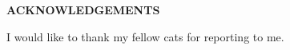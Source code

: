 \begin{center}
    \large{\bf ACKNOWLEDGEMENTS}
\end{center}

I would like to thank my fellow cats for reporting to me.